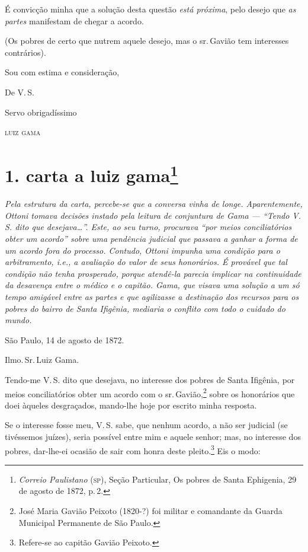 É convicção minha que a solução desta questão \emph{está próxima}, pelo
desejo que \emph{as partes} manifestam de chegar a acordo.

(Os pobres de certo que nutrem aquele desejo, mas o sr.\,Gavião tem
interesses contrários).

\begin{flushright}
Sou com estima e consideração,

De V.\,S.

Servo obrigadíssimo

\textsc{luiz gama}
\end{flushright}

\chapter{1. carta a luiz gama\footnote{\emph{Correio Paulistano} (\textsc{sp}), Seção Particular, Os
  pobres de Santa Ephigenia, 29 de agosto de 1872, p.\,2.}} %

\begin{didascalia}
\emph{Pela estrutura da carta, percebe-se que a conversa vinha de longe.
Aparentemente, Ottoni tomava decisões instado pela leitura de conjuntura
de Gama --- ``Tendo V.\,S. dito que desejava\ldots{}''. Este, ao seu turno,
procurava ``por meios conciliatórios obter um acordo'' sobre uma pendência
judicial que passava a ganhar a forma de um acordo fora do processo.
Contudo, Ottoni impunha uma condição para o arbitramento, i.e., a
avaliação do valor de seus honorários. É provável que tal condição não
tenha prosperado, porque atendê-la parecia implicar na continuidade da
desavença entre o médico e o capitão. Gama, que visava uma solução a um
só tempo amigável entre as partes e que agilizasse a destinação dos
recursos para os pobres do bairro de Santa Ifigênia, mediaria o conflito
com todo o cuidado do mundo.}
\end{didascalia}


São Paulo, 14 de agosto de 1872.

Ilmo.\,Sr.\,Luiz Gama.

Tendo-me V.\,S. dito que desejava, no interesse dos pobres de Santa
Ifigênia, por meios conciliatórios obter um acordo com o sr.\,Gavião,\footnote{ José Maria Gavião Peixoto (1820-?) foi militar e
  comandante da Guarda Municipal Permanente de São Paulo.} sobre os
honorários que doei àqueles desgraçados, mando-lhe hoje por escrito
minha resposta.

Se o interesse fosse meu, V.\,S. sabe, que nenhum acordo, a não ser
judicial (se tivéssemos juízes), seria possível entre mim e aquele
senhor; mas, no interesse dos pobres, dar-lhe-ei ocasião de sair com
honra deste pleito.\footnote{ Refere-se ao capitão Gavião Peixoto.} Eis
o modo:

